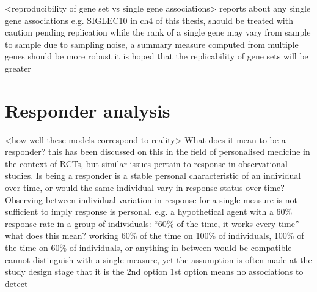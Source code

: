 \begin{outline}
\1 <reproducibility of gene set vs single gene associations> 
    \2 reports about any single gene associations e.g. SIGLEC10 in ch4 of this thesis, should be treated with caution pending replication
    \2 while the rank of a single gene may vary from sample to sample due to sampling noise, a summary measure computed from multiple genes should be more robust
    \2 it is hoped that the replicability of gene sets will be greater

\section{Responder analysis}

\1 <how well these models correspond to reality>
    \2 What does it mean to be a responder?
    \2 this has been discussed on this in the field of personalised medicine in the context of RCTs, but similar issues pertain to response in observational studies. \autocite{senn2018StatisticalPitfallsPersonalized}
    \2 Is being a responder is a stable personal characteristic of an individual over time, or would the same individual vary in response status over time?
    \2 Observing between individual variation in response for a single measure is not sufficient to imply response is personal.
    \2 e.g. a hypothetical agent with a 60\% response rate in a group of individuals: \enquote{60\% of the time, it works every time}
    \2 what does this mean? working 60\% of the time on 100\% of individuals, 100\% of the time on 60\% of individuals, or anything in between would be compatible
    \2 cannot distinguish with a single measure, yet the assumption is often made at the study design stage that it is the 2nd option
    \2 1st option means no associations to detect


\end{outline}
